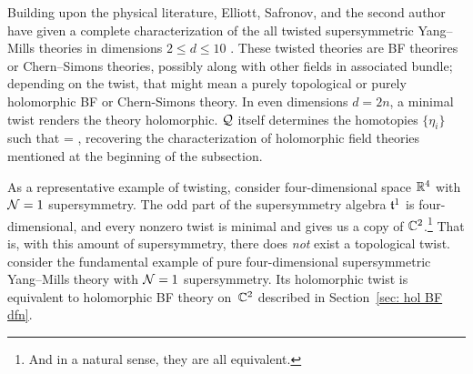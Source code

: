 \documentclass[11pt]{amsart}
\begin{document}
Building upon the physical literature, Elliott, Safronov, and the second author have given a complete characterization of the all twisted supersymmetric Yang--Mills theories in dimensions $2 \leq d \leq 10$ \autocite{ESW}. 
These twisted theories are BF theorires or Chern--Simons theories, possibly along with other fields in associated bundle; 
depending on the twist, that might mean a purely topological or purely holomorphic BF or Chern-Simons theory.
In even dimensions $d = 2n$, a minimal twist renders the theory holomorphic.
$\mathcal Q$ itself determines the homotopies $\{\eta_i\}$ such that 
\beqn
[\cQ,\eta_i] =  ,
\eeqn 
recovering the characterization of holomorphic field theories mentioned at the beginning of the subsection. 

As a representative example of twisting, 
consider four-dimensional space $\mathbb R^4$ with $\mathcal N=1$ supersymmetry.
The odd part of the supersymmetry algebra $\mathfrak t^1$ is four-dimensional, 
and every nonzero twist is minimal and gives us a copy of $\mathbb C^2$.\footnote{And in a natural sense, they are all equivalent.}
That is, with this amount of supersymmetry, there does {\it not} exist a topological twist.
consider the fundamental example of pure four-dimensional supersymmetric Yang--Mills theory with $\mathcal N=1$ supersymmetry. 
Its holomorphic twist is equivalent to holomorphic BF theory on~$\mathbb C^2$ described in Section~\ref{sec: hol BF dfn}.
\end{document}
